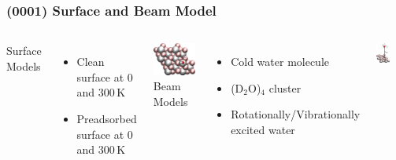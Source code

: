 \documentclass[hyperref={pdfpagelabels=false}]{beamer}
\begin{document}
\begin{frame}
 \frametitle{(0001) Surface and Beam Model}
 \begin{columns}
  Surface Models
  \begin{itemize}
   \item Clean surface at $0$ and $300\,$K
   \item Preadsorbed surface at $0$ and $300\,$K
  \end{itemize} 
  \centering
\includegraphics[width=1.\textwidth]{figures/0001_1-2-diss_top.jpg}
\newline
\pause
  Beam Models
  \begin{itemize}
   \item Cold water molecule
   \item (D$_2$O)$_4$ cluster
   \item Rotationally/Vibrationally excited water
  \end{itemize}
   \centering
 \includegraphics[width=0.5\textwidth]{figures/perspective+h2o_new.png}
\end{columns}
\end{frame}
\end{document}
